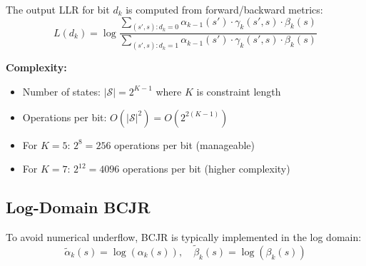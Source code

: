 The output LLR for bit $d_k$ is computed from forward/backward metrics:
\begin{equation}
L(d_k) = \log\frac{\sum_{(s',s): d_k=0} \alpha_{k-1}(s') \cdot \gamma_k(s',s) \cdot \beta_k(s)}{\sum_{(s',s): d_k=1} \alpha_{k-1}(s') \cdot \gamma_k(s',s) \cdot \beta_k(s)}
\label{eq:bcjr-llr}
\end{equation}

\textbf{Complexity:}
\begin{itemize}
\item Number of states: $|\mathcal{S}| = 2^{K-1}$ where $K$ is constraint length
\item Operations per bit: $O(|\mathcal{S}|^2) = O(2^{2(K-1)})$
\item For $K = 5$: $2^8 = 256$ operations per bit (manageable)
\item For $K = 7$: $2^{12} = 4096$ operations per bit (higher complexity)
\end{itemize}

\begin{center}
\end{center}

\subsection{Log-Domain BCJR}

To avoid numerical underflow, BCJR is typically implemented in the log domain:
\begin{equation}
\tilde{\alpha}_k(s) = \log(\alpha_k(s)), \quad \tilde{\beta}_k(s) = \log(\beta_k(s))
\end{equation}

